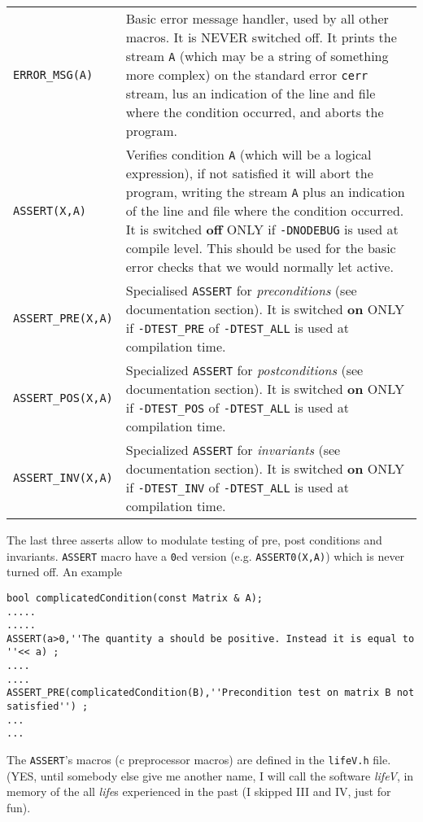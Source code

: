 \begin{tabularx}{\textwidth}{|l|X|}
  \hline \texttt{ERROR\_MSG(A)} & Basic error message handler, used by
  all other macros.  It is NEVER switched off. It prints the stream
  \texttt{A} (which may be a string of something more complex) on the
  standard error \texttt{cerr} stream, lus an indication of the line and
  file where the condition occurred,
  and aborts the program.\\
  \texttt{ASSERT(X,A)} & Verifies condition \texttt{A} (which will be
  a logical expression), if not satisfied it will abort the program,
  writing the stream \texttt{A} plus an indication of the line and
  file where the condition occurred. It is switched \textbf{off} ONLY
  if
  \texttt{-DNODEBUG} is used at compile level. This should be used for the basic error checks that we would normally let active.\\
  \texttt{ASSERT\_PRE(X,A)} & Specialised \texttt{ASSERT} for
  \textit{preconditions} (see documentation section). It is switched
  \textbf{on} ONLY if \texttt{-DTEST\_PRE} of \texttt{-DTEST\_ALL} is
  used at compilation time.\\
 \texttt{ASSERT\_POS(X,A)} & Specialized \texttt{ASSERT} for
  \textit{postconditions} (see documentation section). It is switched
  \textbf{on} ONLY if \texttt{-DTEST\_POS} of \texttt{-DTEST\_ALL} is
  used at compilation time.\\
 \texttt{ASSERT\_INV(X,A)} & Specialized \texttt{ASSERT} for
  \textit{invariants} (see documentation section). It is switched
  \textbf{on} ONLY if \texttt{-DTEST\_INV} of \texttt{-DTEST\_ALL} is
  used at compilation time.\\\hline
\end{tabularx}

The last three asserts allow to modulate testing of pre, post
conditions and invariants. \texttt{ASSERT} macro have a \texttt{0}ed
version (e.g. \texttt{ASSERT0(X,A)}) which is never turned off.  An
example
\begin{verbatim}
bool complicatedCondition(const Matrix & A);
.....
.....
ASSERT(a>0,''The quantity a should be positive. Instead it is equal to ''<< a) ;
....
....
ASSERT_PRE(complicatedCondition(B),''Precondition test on matrix B not satisfied'') ;
...
...
\end{verbatim}
The \texttt{ASSERT}'s macros (c preprocessor macros) are defined in
the \texttt{lifeV.h} file. (YES, until somebody else give me another
name, I will call the software \textit{lifeV}, in memory of the all
\textit{life}s experienced in the past (I skipped III and IV, just for fun).

